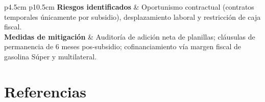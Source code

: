 \documentclass[10pt,]{article}
\begin{document}
\begin{singlespace}
\begin{small}
\begin{longtable}{p{4.5cm} p{10.5cm}}
\textbf{Riesgos identificados} & Oportunismo contractual (contratos temporales únicamente por subsidio), desplazamiento laboral y restricción de caja fiscal. \\ \addlinespace
\textbf{Medidas de mitigación} & Auditoría de adición neta de planillas; cláusulas de permanencia de 6 meses pos-subsidio; cofinanciamiento vía margen fiscal de gasolina Súper y multilateral. \\ \bottomrule
{}
\end{longtable}
\end{small}
\end{singlespace}

\section{Referencias}\label{referencias}
\end{document}
